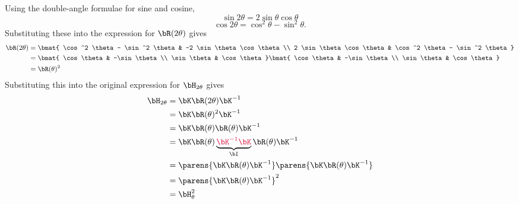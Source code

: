 \begin{problem}
\begin{enumroman}
\begin{answer}
        Using the double-angle formulae for sine and cosine,
        \[ \sin 2\theta = 2 \sin \theta \cos \theta \]
        \[ \cos 2\theta = \cos^2 \theta - \sin^2 \theta. \]
        Substituting these into the expression for $\bR(2\theta)$ gives
        \begin{align*}
          \bR(2\theta) &= \bmat{
            \cos^2 \theta - \sin^2 \theta & -2 \sin \theta \cos \theta \\
            2 \sin \theta \cos \theta & \cos^2 \theta - \sin^2 \theta
          } \\
          &= \bmat{
            \cos \theta & -\sin \theta \\
            \sin \theta & \cos \theta
          } \bmat{
            \cos \theta & -\sin \theta \\
            \sin \theta & \cos \theta
          } \\
          &= \bR(\theta)^2
        \end{align*}
        Substituting this into the original expression for $\bH_{2\theta}$ gives
        \begin{align*}
          \bH_{2\theta} &= \bK \bR(2\theta) \bK^{-1} \\
          &= \bK \bR(\theta)^2 \bK^{-1} \\
          &= \bK \bR(\theta) \bR(\theta) \bK^{-1} \\
          &= \bK \bR(\theta) \underbrace{\crim{\bK^{-1} \bK}}_{\bI} \bR(\theta) \bK^{-1} \\
          &= \parens{\bK \bR(\theta) \bK^{-1}}\parens{\bK \bR(\theta) \bK^{-1}} \\
          &= \parens{\bK \bR(\theta) \bK^{-1}}^2 \\
          &= \bH_\theta^2
        \end{align*}
      \end{answer}
  \end{enumroman}
\end{problem}
